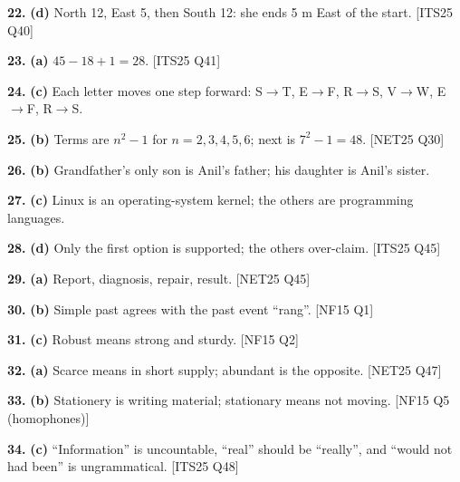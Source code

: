 \documentclass[11pt,a4paper]{article}
\begin{document}
\noindent\textbf{22.} \textbf{(d)} North 12, East 5, then South 12: she ends 5 m East of the start. {\color{ember}\scriptsize[ITS25 Q40]}\par\vspace{3pt}
\noindent\textbf{23.} \textbf{(a)} $45-18+1=28$. {\color{ember}\scriptsize[ITS25 Q41]}\par\vspace{3pt}
\noindent\textbf{24.} \textbf{(c)} Each letter moves one step forward: S$\to$T, E$\to$F, R$\to$S, V$\to$W, E$\to$F, R$\to$S.\par\vspace{3pt}
\noindent\textbf{25.} \textbf{(b)} Terms are $n^2-1$ for $n=2,3,4,5,6$; next is $7^2-1=48$. {\color{ember}\scriptsize[NET25 Q30]}\par\vspace{3pt}
\noindent\textbf{26.} \textbf{(b)} Grandfather's only son is Anil's father; his daughter is Anil's sister.\par\vspace{3pt}
\noindent\textbf{27.} \textbf{(c)} Linux is an operating-system kernel; the others are programming languages.\par\vspace{3pt}
\noindent\textbf{28.} \textbf{(d)} Only the first option is supported; the others over-claim. {\color{ember}\scriptsize[ITS25 Q45]}\par\vspace{3pt}
\noindent\textbf{29.} \textbf{(a)} Report, diagnosis, repair, result. {\color{ember}\scriptsize[NET25 Q45]}\par\vspace{3pt}
\noindent\textbf{30.} \textbf{(b)} Simple past agrees with the past event ``rang''. {\color{ember}\scriptsize[NF15 Q1]}\par\vspace{3pt}
\noindent\textbf{31.} \textbf{(c)} Robust means strong and sturdy. {\color{ember}\scriptsize[NF15 Q2]}\par\vspace{3pt}
\noindent\textbf{32.} \textbf{(a)} Scarce means in short supply; abundant is the opposite. {\color{ember}\scriptsize[NET25 Q47]}\par\vspace{3pt}
\noindent\textbf{33.} \textbf{(b)} Stationery is writing material; stationary means not moving. {\color{ember}\scriptsize[NF15 Q5 (homophones)]}\par\vspace{3pt}
\noindent\textbf{34.} \textbf{(c)} ``Information'' is uncountable, ``real'' should be ``really'', and ``would not had been'' is ungrammatical. {\color{ember}\scriptsize[ITS25 Q48]}\par\vspace{3pt}
\end{document}
